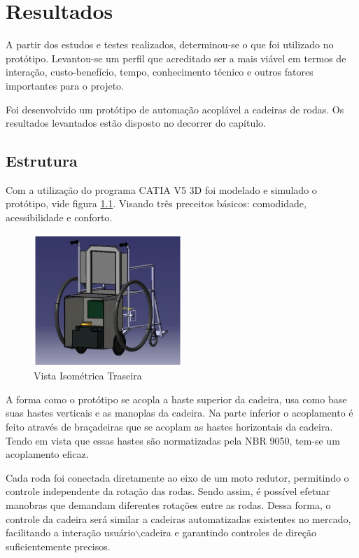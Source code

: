 \chapter[Resultados]{Resultados}

A partir dos estudos e testes realizados, determinou-se o que foi utilizado no protótipo. Levantou-se um perfil que acreditado ser a mais viável em termos de interação, custo-benefício, tempo, conhecimento técnico e outros fatores importantes para o projeto.

Foi desenvolvido um protótipo de automação acoplável a cadeiras de rodas. Os resultados levantados estão disposto no decorrer do capítulo.

\section{Estrutura}

Com a utilização do programa CATIA V5 3D foi modelado e simulado o protótipo, vide figura \ref{fig:vista_isometrica_traseira}. Visando três preceitos básicos: comodidade, acessibilidade e conforto.

\begin{figure}[!htb]
\centering
\includegraphics[width=0.5\textwidth]{figuras/estrutura/vista_isometrica_traseira}
\caption{Vista Isométrica Traseira}
\label{fig:vista_isometrica_traseira}
\end{figure}

A forma como o protótipo se acopla a haste superior da cadeira, usa como base suas hastes verticais e as manoplas da cadeira. Na parte inferior o acoplamento é feito através de braçadeiras que se acoplam as hastes horizontais da cadeira. Tendo em vista que essas hastes são normatizadas pela NBR 9050, tem-se um acoplamento eficaz.

Cada roda foi conectada diretamente ao eixo de um moto redutor, permitindo o controle independente da rotação das rodas. Sendo assim, é possível efetuar manobras que demandam diferentes rotações entre as rodas. Dessa forma, o controle da cadeira será similar a cadeiras automatizadas existentes no mercado, facilitando a interação usuário$\backslash$cadeira e garantindo controles de direção suficientemente precisos.

